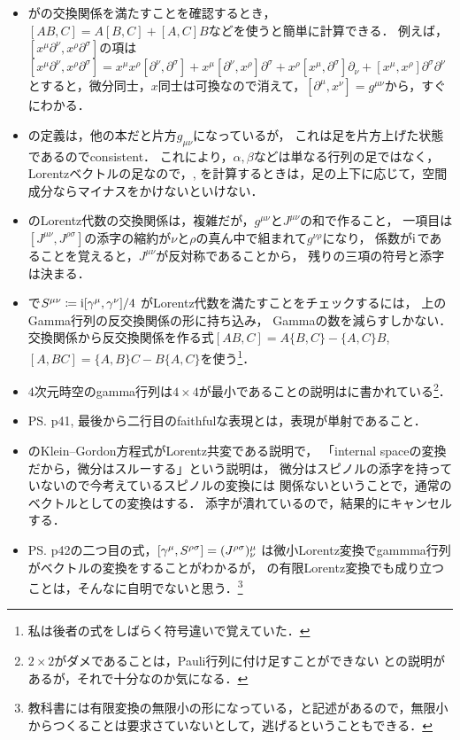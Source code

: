 \begin{itemize}
	\item {}がの交換関係を満たすことを確認するとき，
		$[AB, C]= A[B,C] + [A, C]B$などを使うと簡単に計算できる．
		例えば，$[x^{\mu}\partial^{\nu}, x^{\rho}\partial^{\sigma}]$の項は
		$[x^{\mu}\partial^{\nu}, x^{\rho}\partial^{\sigma}] = x^{\mu}x^{\rho}[\partial^{\nu}, \partial^{\sigma}] + x^{\mu}[\partial^{\nu}, x^{\rho}] \partial^{\sigma} + x^{\rho}[x^{\mu}, \partial^{\sigma}]\partial_\nu + [x^{\mu}, x^{\rho}]\partial^{\sigma}\partial^{\nu}$
		とすると，微分同士，$x$同士は可換なので消えて，$[\partial^{\mu}, x^{\nu}] = g^{\mu\nu}$から，すぐにわかる．
			\item {}の定義は，他の本だと片方$g_{\mu\nu}$になっているが，
		これは足を片方上げた状態であるのでconsistent．
		これにより，$\alpha, \beta$などは単なる行列の足ではなく，
		Lorentzベクトルの足なので，, を計算するときは，足の上下に応じて，空間成分ならマイナスをかけないといけない．
	\item {}のLorentz代数の交換関係は，複雑だが，$g^{\mu\nu}$と$J^{\mu\nu}$の和で作ること，
		一項目は$[J^{\mu\nu}, J^{\rho\sigma}]$の添字の縮約が$\nu$と$\rho$の真ん中で組まれて$g^{\nu\rho}$になり，
		係数が$\mathrm{i}$であることを覚えると，$J^{\mu\nu}$が反対称であることから，
		残りの三項の符号と添字は決まる．
	\item {}で$S^{\mu\nu}\coloneqq \mathrm{i}\qty[\gamma^{\mu}, \gamma^{\nu}]/4$
		がLorentz代数を満たすことをチェックするには，
		上のGamma行列の反交換関係の形に持ち込み，
		Gammaの数を減らすしかない．
		交換関係から反交換関係を作る式$[AB, C] = A\{B, C\} - \{A, C\}B$, 
		$[A, BC] = \{A, B\}C - B\{A, C\}$を使う\footnote{私は後者の式をしばらく符号違いで覚えていた．}．
	\item $4$次元時空のgamma行列は$4\times4$が最小であることの説明は\cite[pp.92-94]{Sakamoto2014}に書かれている\footnote{
			$2\times 2$がダメであることは，Pauli行列に付け足すことができない
			との説明があるが，それで十分なのか気になる．
		}．
	\item PS. p41, 最後から二行目のfaithfulな表現とは，表現が単射であること．
	\item {}のKlein--Gordon方程式がLorentz共変である説明で，
		「internal spaceの変換だから，微分はスルーする」という説明は，
		微分はスピノルの添字を持っていないので今考えているスピノルの変換には
		関係ないということで，通常のベクトルとしての変換はする．
		添字が潰れているので，結果的にキャンセルする．
	\item PS. p42の二つ目の式，$\qty[\gamma^{\mu}, S^{\rho\sigma}] = (J^{{\rho\sigma}})^{\mu}_{\nu}$
		は微小Lorentz変換でgammma行列がベクトルの変換をすることがわかるが，
		の有限Lorentz変換でも成り立つことは，そんなに自明でないと思う．\footnote{教科書には有限変換の無限小の形になっている，と記述があるので，無限小からつくることは要求さていないとして，逃げるということもできる．}


\end{itemize}
